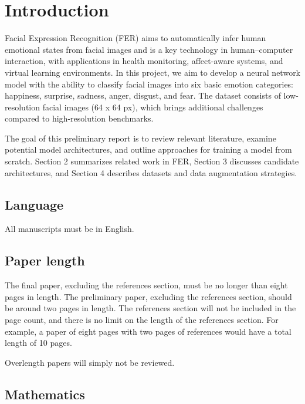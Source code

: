 \section{Introduction}
\label{sec:intro}


Facial Expression Recognition (FER) aims to automatically infer human emotional states from facial images and is a key technology in human–computer interaction, with applications in health monitoring, affect-aware systems, and virtual learning environments. In this project, we aim to develop a neural network model with the ability to classify facial images into six basic emotion categories: happiness, surprise, sadness, anger, disgust, and fear. The dataset consists of low-resolution facial images (64 x 64 px), which brings additional challenges compared to high-resolution benchmarks.

The goal of this preliminary report is to review relevant literature, examine potential model architectures, and outline approaches for training a model from scratch. Section 2 summarizes related work in FER, Section 3 discusses candidate architectures, and Section 4 describes datasets and data augmentation strategies.

\iffalse
\subsection{Language}

All manuscripts must be in English.

\subsection{Paper length}
The final paper, excluding the references section, must be no longer than eight pages in length. The preliminary paper, excluding the references section, should be around two pages in length.
The references section will not be included in the page count, and there is no limit on the length of the references section.
For example, a paper of eight pages with two pages of references would have a total length of 10 pages.

Overlength papers will simply not be reviewed.
\subsection{Mathematics}

